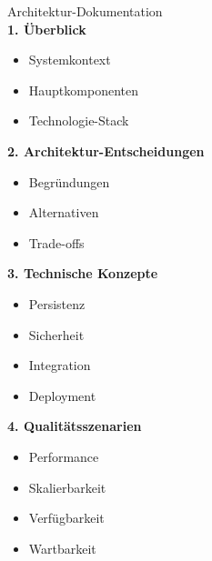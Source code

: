 \begin{KR}{Architektur-Dokumentation}\\
\textbf{1. Überblick}
\begin{itemize}
    \item Systemkontext
    \item Hauptkomponenten
    \item Technologie-Stack
\end{itemize}

\textbf{2. Architektur-Entscheidungen}
\begin{itemize}
    \item Begründungen
    \item Alternativen
    \item Trade-offs
\end{itemize}

\textbf{3. Technische Konzepte}
\begin{itemize}
    \item Persistenz
    \item Sicherheit
    \item Integration
    \item Deployment
\end{itemize}

\textbf{4. Qualitätsszenarien}
\begin{itemize}
    \item Performance
    \item Skalierbarkeit
    \item Verfügbarkeit
    \item Wartbarkeit
\end{itemize}
\end{KR}

